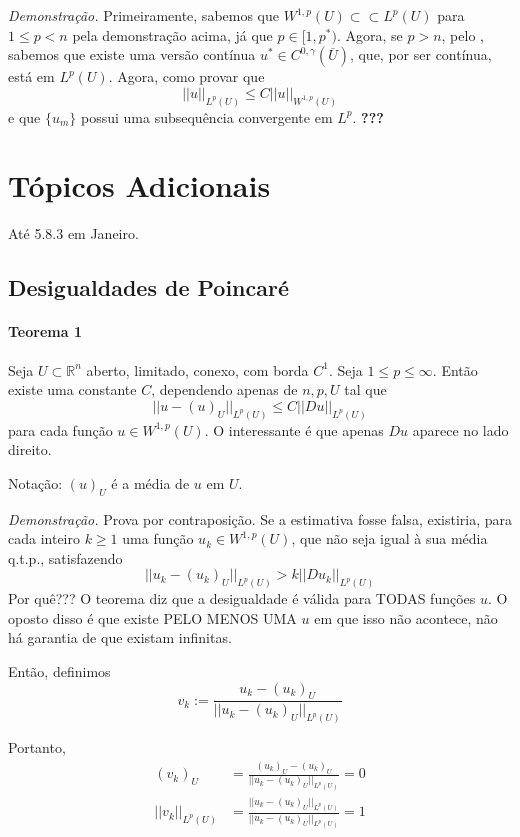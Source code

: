 \documentclass[11pt]{article}
\begin{document}
\textit{Demonstração.} Primeiramente, sabemos que $W^{1,p}(U) \subset\subset L^p(U)$ para $1\leq p < n$ pela demonstração acima, já que $p \in [1,p^*)$. Agora, se $p>n$, pelo , sabemos que existe uma versão contínua $u^* \in C^{0, \gamma}(\overline{U})$, que, por ser contínua, está em $L^p(U)$. Agora, como provar que \[ ||u||_{L^p(U)} \leq C ||u||_{W^{1,p}(U)} \] e que $\{u_m\}$ possui uma subsequência convergente em $L^p$. \textbf{???}








\section{Tópicos Adicionais}

Até 5.8.3 em Janeiro.


\subsection{Desigualdades de Poincaré}

\paragraph{Teorema 1}\label{t:sobolev-poincare-1} Seja \(U \subset \mathbb{R}^n \) aberto, limitado, conexo, com borda \(C^1\). Seja \(1 \leq p \leq \infty \). Então existe uma constante \(C\), dependendo apenas de \(n, p, U\) tal que \[ ||u- (u)_U ||_{L^p(U)} \leq C ||Du||_{L^p(U)} \] para cada função \(u \in W^{1,p}(U)\). O interessante é que apenas \(Du\) aparece no lado direito.

Notação: \((u)_U\) é a média de \(u\) em \(U\).

\textit{Demonstração.} Prova por contraposição. Se a estimativa fosse falsa, existiria, para cada inteiro $k\geq1$ uma função $u_k \in W^{1,p}(U)$, que não seja igual à sua média q.t.p., satisfazendo \begin{equation}\label{eq:desig-poincare-1}
	 ||u_k - (u_k)_U ||_{L^p(U)} > k || Du_k ||_{L^p(U)}
\end{equation}  Por quê??? O teorema diz que a desigualdade é válida para TODAS funções $u$. O oposto disso é que existe PELO MENOS UMA $u$ em que isso não acontece, não há garantia de que existam infinitas.

Então, definimos \[v_k := \frac{u_k - (u_k)_U}{||u_k - (u_k)_U||_{L^p(U)}} \]

Portanto, \begin{align*}
	(v_k)_U &= \frac{(u_k)_U - (u_k)_U}{||u_k - (u_k)_U||_{L^p(U)}} = 0 \\
	||v_k||_{L^p(U)} &= \frac{||u_k - (u_k)_U||_{L^p(U)}}{||u_k - (u_k)_U||_{L^p(U)}} = 1
\end{align*}
\end{document}
